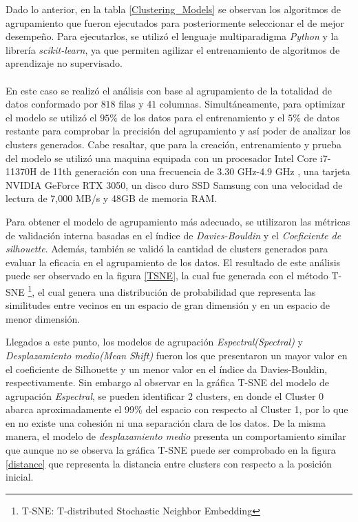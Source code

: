 Dado lo anterior, en la tabla \ref{Clustering_Models} se observan los algoritmos de agrupamiento que fueron ejecutados para posteriormente seleccionar el de mejor desempeño. Para ejecutarlos, se utilizó el lenguaje multiparadigma \textit{Python} y la librería \textit{scikit-learn}, ya que permiten agilizar el entrenamiento de algoritmos de aprendizaje no supervisado.
\\\\
En este caso se realizó el análisis con base al agrupamiento de la totalidad de datos conformado por $818$ filas y $41$ columnas. Simultáneamente, para optimizar el modelo se utilizó el $95\%$ de los datos para el entrenamiento y el $5\%$ de datos restante para comprobar la precisión del agrupamiento y así poder de analizar los clusters generados. Cabe resaltar, que para la creación, entrenamiento y prueba del modelo se utilizó una maquina equipada con un procesador Intel Core i7-11370H de 11th generación con una frecuencia de 3.30 GHz-4.9 GHz , una tarjeta NVIDIA GeForce RTX 3050, un disco duro SSD Samsung con una velocidad de lectura de 7,000 MB/s y 48GB de memoria RAM. 

Para obtener el modelo de agrupamiento más adecuado, se utilizaron las métricas de validación interna basadas en el índice de \textit{Davies-Bouldin} y el \textit{Coeficiente de silhouette}. Además, también se validó la cantidad de clusters generados para evaluar la eficacia en el agrupamiento de los datos. El resultado de este análisis puede ser observado en la figura \ref{TSNE}, la cual fue generada con el método T-SNE \footnote{T-SNE: T-distributed Stochastic Neighbor Embedding}, el cual genera una distribución de probabilidad que representa las similitudes entre vecinos en un espacio de gran dimensión y en un espacio de menor dimensión. 

Llegados a este punto, los modelos de agrupación \textit{Espectral(Spectral)} y \textit{Desplazamiento medio(Mean Shift)}  fueron los que presentaron un mayor valor en el coeficiente de Silhouette y un menor valor en el índice da Davies-Bouldin, respectivamente. Sin embargo al observar en la gráfica T-SNE del modelo de agrupación \textit{Espectral}, se pueden identificar 2 clusters, en donde el Cluster 0 abarca aproximadamente el 99\% del espacio con respecto al Cluster 1, por lo que en no existe una cohesión ni una separación clara de los datos. De la misma manera, el modelo de \textit{desplazamiento medio} presenta un comportamiento similar que aunque no se observa la gráfica T-SNE puede ser comprobado en la figura \ref{distance} que representa la distancia entre clusters con respecto a la posición inicial.

